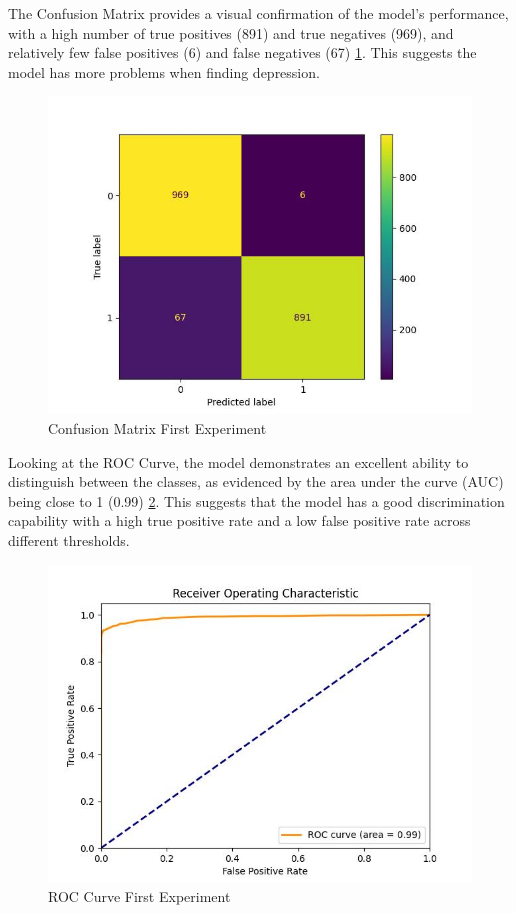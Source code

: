 The Confusion Matrix provides a visual confirmation of the model's performance, with a high number of true positives (891) and true negatives (969), and relatively few false positives (6) and false negatives (67) \ref{confusionMatrixFirstExperiment}. This suggests the model has more problems when finding depression.

\begin{figure}[htbp]
	\centering
		\includegraphics[scale=0.8]{LaTeX Bachelor Thesis Depression Signs Detection/figures/metrics/experiment1English/confusionMatrix.jpg}
	\caption{Confusion Matrix First Experiment}
	\label{confusionMatrixFirstExperiment}
\end{figure}

Looking at the ROC Curve, the model demonstrates an excellent ability to distinguish between the classes, as evidenced by the area under the curve (AUC) being close to 1 (0.99) \ref{rocCurveFirstExperiment}. This suggests that the model has a good discrimination capability with a high true positive rate and a low false positive rate across different thresholds.

\begin{figure}[htbp]
	\centering
		\includegraphics[scale=0.8]{LaTeX Bachelor Thesis Depression Signs Detection/figures/metrics/experiment1English/roc_curve.jpg}
	\caption{ROC Curve First Experiment}
	\label{rocCurveFirstExperiment}
\end{figure}

